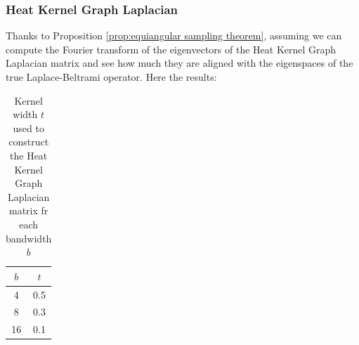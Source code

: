 \subsubsection{Heat Kernel Graph Laplacian}
Thanks to Proposition \ref{prop:equiangular sampling theorem}, assuming we can compute the Fourier transform of the eigenvectors of the Heat Kernel Graph Laplacian matrix and see how much they are aligned with the eigenspaces of the true Laplace-Beltrami operator. Here the results:


\begin{table}[h!]
	\centering
	\label{table:equiangular kernel width}
	\caption{Kernel width $t$ used to construct the Heat Kernel Graph Laplacian matrix fr each bandwidth $b$}
	\begin{tabular}{ c|c } 
	
$b$ & $t$ \\ 
	\hline
4 & 0.5 \\ 
8 & 0.3 \\ 
16 & 0.1 \\ 
	
	\end{tabular}
\end{table}

